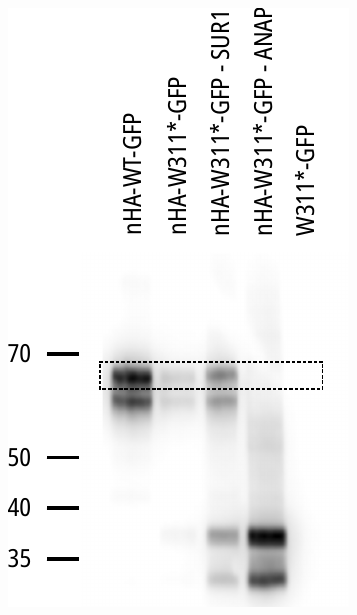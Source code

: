 \begin{figure}[hbtp]
\begin{subfigure}[t]{0.25\textwidth}
	\end{subfigure}
	\hfill
	\begin{subfigure}[t]{0.25\textwidth}
		\caption{}\label{ch3fig:western_1b}
		\centering
		\includegraphics[width=\textwidth]{western_1b.pdf}
	\end{subfigure}
	\hfill
	\begin{subfigure}[t]{0.4\textwidth}
		\caption{}\label{ch3fig:western_2}
		\centering

\end{subfigure}
\end{figure}

